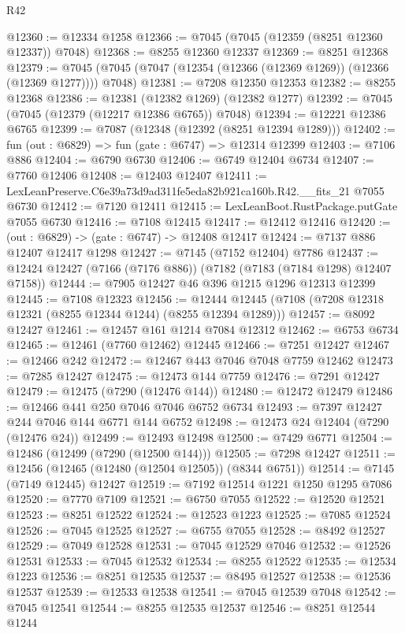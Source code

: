 \begin{lexlean}{R42}
\begin{coremodule}
{@12360 := @12334 @1258
@12366 := @7045 (@7045 (@12359 (@8251 @12360 @12337)) @7048)
@12368 := @8255 @12360 @12337
@12369 := @8251 @12368
@12379 := @7045 (@7045 (@7047 (@12354 (@12366 (@12369 @1269)) (@12366 (@12369 @1277)))) @7048)
@12381 := @7208 @12350 @12353
@12382 := @8255 @12368
@12386 := @12381 (@12382 @1269) (@12382 @1277)
@12392 := @7045 (@7045 (@12379 (@12217 @12386 @6765)) @7048)
@12394 := @12221 @12386 @6765
@12399 := @7087 (@12348 (@12392 (@8251 @12394 @1289)))
@12402 := fun (out : @6829) => fun (gate : @6747) => @12314 @12399
@12403 := @7106 @886
@12404 := @6790 @6730
@12406 := @6749 @12404 @6734
@12407 := @7760 @12406
@12408 := @12403 @12407
@12411 := LexLeanPreserve.C6e39a73d9ad311fe5eda82b921ca160b.R42.__fits_21 @7055 @6730
@12412 := @7120 @12411
@12415 := LexLeanBoot.RustPackage.putGate @7055 @6730
@12416 := @7108 @12415
@12417 := @12412 @12416
@12420 := (out : @6829) -> (gate : @6747) -> @12408 @12417
@12424 := @7137 @886 @12407 @12417 @1298
@12427 := @7145 (@7152 @12404) @7786
@12437 := @12424 @12427 (@7166 (@7176 @886)) (@7182 (@7183 (@7184 @1298) @12407 @7158))
@12444 := @7905 @12427 @46 @396 @1215 @1296 @12313 @12399
@12445 := @7108 @12323
@12456 := @12444 @12445 (@7108 (@7208 @12318 @12321 (@8255 @12344 @1244) (@8255 @12394 @1289)))
@12457 := @8092 @12427
@12461 := @12457 @161 @1214 @7084 @12312
@12462 := @6753 @6734
@12465 := @12461 (@7760 @12462) @12445
@12466 := @7251 @12427
@12467 := @12466 @242
@12472 := @12467 @443 @7046 @7048 @7759 @12462
@12473 := @7285 @12427
@12475 := @12473 @144 @7759
@12476 := @7291 @12427
@12479 := @12475 (@7290 (@12476 @144))
@12480 := @12472 @12479
@12486 := @12466 @441 @250 @7046 @7046 @6752 @6734
@12493 := @7397 @12427 @244 @7046 @144 @6771 @144 @6752
@12498 := @12473 @24 @12404 (@7290 (@12476 @24))
@12499 := @12493 @12498
@12500 := @7429 @6771
@12504 := @12486 (@12499 (@7290 (@12500 @144)))
@12505 := @7298 @12427
@12511 := @12456 (@12465 (@12480 (@12504 @12505)) (@8344 @6751))
@12514 := @7145 (@7149 @12445) @12427
@12519 := @7192 @12514 @1221 @1250 @1295 @7086
@12520 := @7770 @7109
@12521 := @6750 @7055
@12522 := @12520 @12521
@12523 := @8251 @12522
@12524 := @12523 @1223
@12525 := @7085 @12524
@12526 := @7045 @12525
@12527 := @6755 @7055
@12528 := @8492 @12527
@12529 := @7049 @12528
@12531 := @7045 @12529 @7046
@12532 := @12526 @12531
@12533 := @7045 @12532
@12534 := @8255 @12522
@12535 := @12534 @1223
@12536 := @8251 @12535
@12537 := @8495 @12527
@12538 := @12536 @12537
@12539 := @12533 @12538
@12541 := @7045 @12539 @7048
@12542 := @7045 @12541
@12544 := @8255 @12535 @12537
@12546 := @8251 @12544 @1244
}
\end{coremodule}
\end{lexlean}
